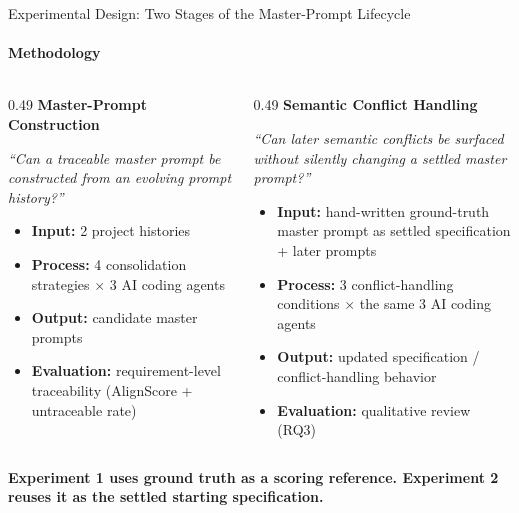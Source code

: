 \documentclass[aspectratio=169,11pt,c]{beamer}
\newcommand{\takeaway}[1]{\begin{center}{\bfseries\color{accentorange}\large #1}\end{center}}
\begin{document}
\begin{frame}{Experimental Design: Two Stages of the Master-Prompt Lifecycle}
  \framesubtitle{Methodology}
  \begin{columns}[T]
    \begin{column}{0.49\textwidth}
      {\small\bfseries\color{primaryblue}Master-Prompt Construction}
      \vspace{2pt}
      {\scriptsize\itshape\color{inkgray}``Can a traceable master prompt be constructed from an evolving prompt history?''\par}
      \vspace{5pt}
      \begin{itemize}\scriptsize
        \item \textbf{Input:} 2 project histories
        \item \textbf{Process:} 4 consolidation strategies $\times$ 3 AI coding agents
        \item \textbf{Output:} candidate master prompts
        \item \textbf{Evaluation:} requirement-level traceability (AlignScore + untraceable rate)
      \end{itemize}
    \end{column}
    \begin{column}{0.49\textwidth}
      {\small\bfseries\color{primaryblue}Semantic Conflict Handling}
      \vspace{2pt}
      {\scriptsize\itshape\color{inkgray}``Can later semantic conflicts be surfaced without silently changing a settled master prompt?''\par}
      \vspace{5pt}
      \begin{itemize}\scriptsize
        \item \textbf{Input:} hand-written ground-truth master prompt as settled specification + later prompts
        \item \textbf{Process:} 3 conflict-handling conditions $\times$ the same 3 AI coding agents
        \item \textbf{Output:} updated specification / conflict-handling behavior
        \item \textbf{Evaluation:} qualitative review (RQ3)
      \end{itemize}
    \end{column}
  \end{columns}
  \vspace{6pt}
  \takeaway{Experiment 1 uses ground truth as a scoring reference. Experiment 2 reuses it as the settled starting specification.}
\end{frame}
\end{document}
